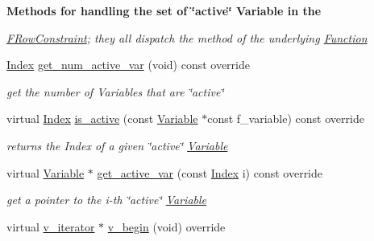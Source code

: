 \begin{Indent}\textbf{ Methods for handling the set of \char`\"{}active\char`\"{} Variable in the}\par
{\em \mbox{\hyperlink{class_s_m_spp__di__unipi__it_1_1_f_row_constraint}{F\+Row\+Constraint}}; they all dispatch the method of the underlying \mbox{\hyperlink{class_s_m_spp__di__unipi__it_1_1_function}{Function}} }\begin{DoxyCompactItemize}
\item 
\mbox{\hyperlink{group___thin_var_dep_interface___c_l_a_s_s_e_s_gad53d6229d7ec28555a9c9c2fd9abf773}{Index}} \mbox{\hyperlink{class_s_m_spp__di__unipi__it_1_1_f_row_constraint_acc8ac3c57cc2c71ac3fe6c409fe53074}{get\+\_\+num\+\_\+active\+\_\+var}} (void) const override
\begin{DoxyCompactList}\small\item\em get the number of Variables that are \char`\"{}active\char`\"{} \end{DoxyCompactList}\item 
virtual \mbox{\hyperlink{group___thin_var_dep_interface___c_l_a_s_s_e_s_gad53d6229d7ec28555a9c9c2fd9abf773}{Index}} \mbox{\hyperlink{class_s_m_spp__di__unipi__it_1_1_f_row_constraint_ae2efd3cdf1d4fd41cbafda3c49facfa5}{is\+\_\+active}} (const \mbox{\hyperlink{class_s_m_spp__di__unipi__it_1_1_variable}{Variable}} $\ast$const f\+\_\+variable) const override
\begin{DoxyCompactList}\small\item\em returns the Index of a given \char`\"{}active\char`\"{} \mbox{\hyperlink{class_s_m_spp__di__unipi__it_1_1_variable}{Variable}} \end{DoxyCompactList}\item 
virtual \mbox{\hyperlink{class_s_m_spp__di__unipi__it_1_1_variable}{Variable}} $\ast$ \mbox{\hyperlink{class_s_m_spp__di__unipi__it_1_1_f_row_constraint_a8599e4f65a8e9750fa7020ff2f50161f}{get\+\_\+active\+\_\+var}} (const \mbox{\hyperlink{group___thin_var_dep_interface___c_l_a_s_s_e_s_gad53d6229d7ec28555a9c9c2fd9abf773}{Index}} i) const override
\begin{DoxyCompactList}\small\item\em get a pointer to the i-\/th \char`\"{}active\char`\"{} \mbox{\hyperlink{class_s_m_spp__di__unipi__it_1_1_variable}{Variable}} \end{DoxyCompactList}\item 
virtual \mbox{\hyperlink{class_s_m_spp__di__unipi__it_1_1_thin_var_dep_interface_1_1v__iterator}{v\+\_\+iterator}} $\ast$ \mbox{\hyperlink{class_s_m_spp__di__unipi__it_1_1_f_row_constraint_ad0b5bcf42a678385fdba6fe41ce9626b}{v\+\_\+begin}} (void) override

\end{DoxyCompactItemize}
\end{Indent}
